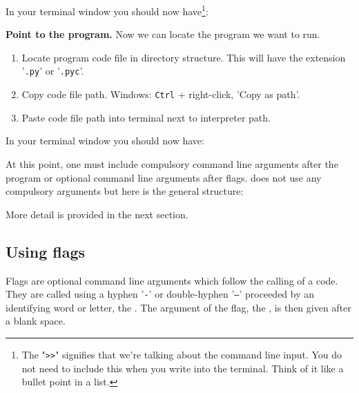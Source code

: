 In your terminal window you should now have\footnote{The "\texttt{>>}" signifies that we're talking about the command line input. You do not need to include this when you write into the terminal. Think of it like a bullet point in a list.}:


\textbf{Point to the program.} Now we can locate the program we want to run.

\begin{enumerate}
	\item	Locate program code file in directory structure. This will have the extension '\texttt{.py}' or '\texttt{.pyc}'.
	\item	Copy code file path. Windows: \texttt{Ctrl} + right-click, 'Copy as path'.
	\item	Paste code file path into terminal next to interpreter path.
\end{enumerate}

In your terminal window you should now have:


At this point, one must include compulsory command line arguments after the program or optional command line arguments after flags. \labtools{} does not use any compulsory arguments but here is the general structure:


More detail is provided in the next section.

\subsection{Using flags}\label{ssec:running:flags}
Flags are optional command line arguments which follow the calling of a code. They are called using a hyphen '\texttt{-}' or double-hyphen '\texttt{--}' proceeded by an identifying word or letter, the . The argument of the flag, the , is then given after a blank space.

